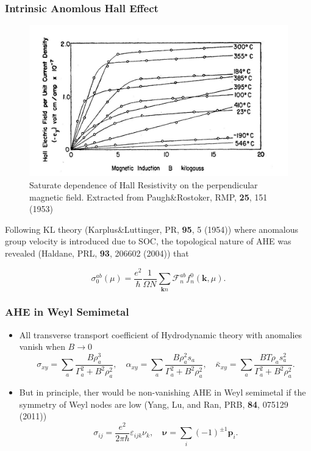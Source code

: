 \documentclass[10pt,aspectratio=43,xcolor=x11names,t]{beamer}%
\begin{document}
		\begin{frame}\frametitle{Intrinsic Anomlous Hall Effect}
			\begin{figure}[!htp]
				\centering
				\includegraphics[scale=0.8]{AnomalousHall.png}
				\caption{Saturate dependence of Hall Resistivity on the perpendicular magnetic field. Extracted from {\scriptsize Paugh\&Rostoker, RMP, \textbf{25}, 151 (1953)}}
			\end{figure}
			\vspace{-1em}
			\pause
			Following KL theory ({\scriptsize Karplus\&Luttinger, PR, \textbf{95}, 5 (1954)}) where anomalous group velocity is introduced due to SOC, the topological nature of AHE was revealed ({\scriptsize Haldane, PRL, \textbf{93}, 206602 (2004)}) that
			\begin{block}{}
				\begin{equation*}
					\sigma^{ab}_0(\mu)=\dfrac{e^2}{\hbar}\dfrac{1}{\Omega N}\sum_{\bm{k}n}\mathcal{F}^{ab}_n f_n^0(\bm{k},\mu).
				\end{equation*}
			\end{block}
		\end{frame}
		
		\begin{frame}\frametitle{AHE in Weyl Semimetal}
			\begin{itemize}
				\item All transverse transport coefficient of Hydrodynamic theory with anomalies vanish when $B\rightarrow0$
				\begin{equation*}
					\sigma_{xy}=\sum_a\dfrac{B\rho_a^3}{\Gamma_a^2+B^2\rho_a^2},\quad \alpha_{xy}=\sum_a\dfrac{B\rho_a^2s_a}{\Gamma_a^2+B^2\rho_a^2},\quad \bar{\kappa}_{xy}=\sum_a\dfrac{BT\rho_a s_a^2}{\Gamma_a^2+B^2\rho_a^2}.
				\end{equation*}
				\pause
				\item But in principle, ther would be non-vanishing AHE in Weyl semimetal if the symmetry of Weyl nodes are low ({\scriptsize Yang, Lu, and Ran, PRB, \textbf{84}, 075129 (2011)})
				\begin{equation*}
					\sigma_{ij}=\dfrac{e^2}{2\pi\hbar}\varepsilon_{ijk}\nu_k,\quad \bm{\nu}=\sum_i (-1)^{\pm1}\bm{p}_i.
				\end{equation*}
			\end{itemize}
		\end{frame}
		
\end{document}
